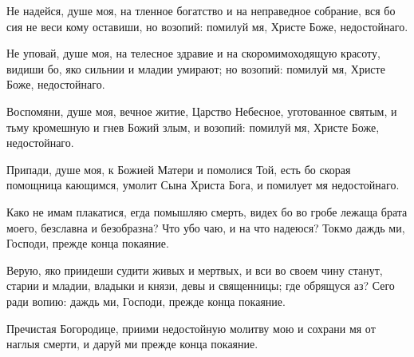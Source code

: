 \begin{mymulticols}


Не надейся, душе моя, на тленное богатство и на неправедное собрание, вся бо сия не веси кому оставиши, но возопий: помилуй мя, Христе Боже, недостойнаго.


Не уповай, душе моя, на телесное здравие и на скоромимоходящую красоту, видиши бо, яко сильнии и младии умирают; но возопий: помилуй мя, Христе Боже, недостойнаго.

\slava

Воспомяни, душе моя, вечное житие, Царство Небесное, уготованное святым, и тьму кромешную и гнев Божий злым, и возопий: помилуй мя, Христе Боже, недостойнаго.

\inyne

Припади, душе моя, к Божией Матери и помолися Той, есть бо скорая помощница кающимся, умолит Сына Христа Бога, и помилует мя недостойнаго.




Како не имам плакатися, егда помышляю смерть, видех бо во гробе лежаща брата моего, безславна и безобразна? Что убо чаю, и на что надеюся? Токмо даждь ми, Господи, прежде конца покаяние. 

\slava

Верую, яко приидеши судити живых и мертвых, и вси во своем чину станут, старии и младии, владыки и князи, девы и священницы; где обрящуся аз? Сего ради вопию: даждь ми, Господи, прежде конца покаяние.

\inyne

Пречистая Богородице, приими недостойную молитву мою и сохрани мя от наглыя смерти, и даруй ми прежде конца покаяние.




\end{mymulticols}
